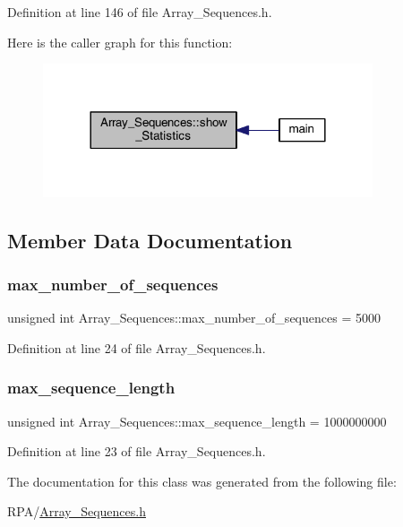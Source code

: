 Definition at line 146 of file Array\+\_\+\+Sequences.\+h.

Here is the caller graph for this function\+:
\nopagebreak
\begin{figure}[H]
\begin{center}
\leavevmode
\includegraphics[width=276pt]{class_array___sequences_ab0735daa57cd712e08843e9c79e40488_icgraph}
\end{center}
\end{figure}


\subsection{Member Data Documentation}
\mbox{\label{class_array___sequences_a15164d8882eac2d8cf368f74fde967d2}} 
\subsubsection{\texorpdfstring{max\+\_\+number\+\_\+of\+\_\+sequences}{max\_number\_of\_sequences}}
{\footnotesize\ttfamily unsigned int Array\+\_\+\+Sequences\+::max\+\_\+number\+\_\+of\+\_\+sequences = 5000\hspace{0.3cm}{\ttfamily [static]}}



Definition at line 24 of file Array\+\_\+\+Sequences.\+h.

\mbox{\label{class_array___sequences_a05103713b20762f7e2a4a970a35514f2}} 
\subsubsection{\texorpdfstring{max\+\_\+sequence\+\_\+length}{max\_sequence\_length}}
{\footnotesize\ttfamily unsigned int Array\+\_\+\+Sequences\+::max\+\_\+sequence\+\_\+length = 1000000000\hspace{0.3cm}{\ttfamily [static]}}



Definition at line 23 of file Array\+\_\+\+Sequences.\+h.



The documentation for this class was generated from the following file\+:\begin{DoxyCompactItemize}
\item 
R\+P\+A/\mbox{\hyperlink{_array___sequences_8h}{Array\+\_\+\+Sequences.\+h}}\end{DoxyCompactItemize}
